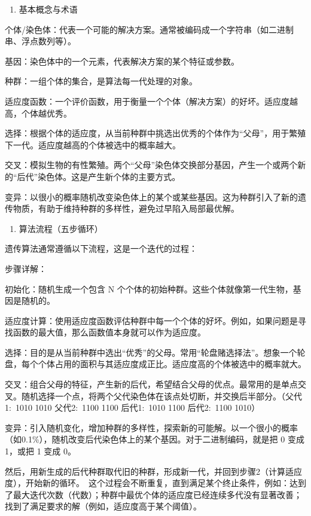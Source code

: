 \begin{enumerate}
\def\labelenumi{\arabic{enumi}.}
\tightlist
\item
  基本概念与术语
\end{enumerate}

个体/染色体：代表一个可能的解决方案。通常被编码成一个字符串（如二进制串、浮点数列等）。

基因：染色体中的一个元素，代表解决方案的某个特征或参数。

种群：一组个体的集合，是算法每一代处理的对象。

适应度函数：一个评价函数，用于衡量一个个体（解决方案）的好坏。适应度越高，个体越优秀。

选择：根据个体的适应度，从当前种群中挑选出优秀的个体作为``父母''，用于繁殖下一代。适应度越高的个体被选中的概率越大。

交叉：模拟生物的有性繁殖。两个``父母''染色体交换部分基因，产生一个或两个新的``后代''染色体。这是产生新个体的主要方式。

变异：以很小的概率随机改变染色体上的某个或某些基因。这为种群引入了新的遗传物质，有助于维持种群的多样性，避免过早陷入局部最优解。

\begin{enumerate}
\def\labelenumi{\arabic{enumi}.}
\setcounter{enumi}{1}
\tightlist
\item
  算法流程（五步循环）
\end{enumerate}

遗传算法通常遵循以下流程，这是一个迭代的过程：

步骤详解：

初始化：随机生成一个包含 N 个个体的初始种群。这些个体就像第一代生物，基因是随机的。

适应度计算：使用适应度函数评估种群中每一个个体的好坏。例如，如果问题是寻找函数的最大值，那么函数值本身就可以作为适应度。

选择：目的是从当前种群中选出``优秀''的父母。常用``轮盘赌选择法''。想象一个轮盘，每个个体占用的面积与其适应度成正比。适应度高的个体被选中的概率就大。

交叉：组合父母的特征，产生新的后代，希望结合父母的优点。最常用的是单点交叉。随机选择一个点，将两个父代染色体在该点处切断，并交换后半部分。（父代1:~1010 \textbar{} 1010 父代2:~1100 \textbar{} 1100 后代1:~1010 1100 后代2:~1100 1010）

变异：引入随机变化，增加种群的多样性，探索新的可能解。以一个很小的概率（如0.1\%），随机改变后代染色体上的某个基因。对于二进制编码，就是把 0 变成 1，或把 1 变成 0。

然后，用新生成的后代种群取代旧的种群，形成新一代，并回到步骤2（计算适应度），开始新的循环。~这个过程会不断重复，直到满足某个终止条件，例如：达到了最大迭代次数（代数）；种群中最优个体的适应度已经连续多代没有显著改善；找到了满足要求的解（例如，适应度高于某个阈值）。

